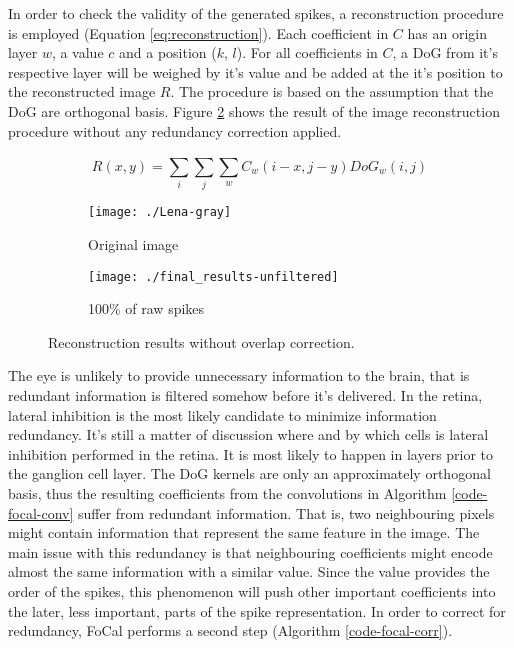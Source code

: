 In order to check the validity of the generated spikes, a reconstruction procedure is employed (Equation \ref{eq:reconstruction}). Each coefficient in $C$ has an origin layer $w$, a value $c$ and a position ($k$, $l$). For all coefficients in $C$, a DoG from it's respective layer will be weighed by it's value and be added at the it's position to the reconstructed image $R$. The procedure is based on the assumption that the DoG are orthogonal basis. Figure \ref{pic-unfiltered-spikes} shows the result of the image reconstruction procedure without any redundancy correction applied.

\begin{equation}
  R(x,y) = \sum_{i}^{} \sum_{j}^{} \sum_{w}^{} C_{w}(i - x, j - y)DoG_{w}(i, j)
  \label{eq:reconstruction}
\end{equation}

\begin{figure}[hbt]
  \centering
  \begin{subfigure}[t]{0.3\textwidth}
    \centering
    \captionsetup{justification=centering,margin=0.1cm}
    \texttt{[image: ./Lena-gray]}
    \caption{Original image}
  \end{subfigure}
  \begin{subfigure}[t]{0.3\textwidth}
    \centering
    \captionsetup{justification=centering,margin=0.1cm}
    \texttt{[image: ./final\_results-unfiltered]}
    \caption{100\% of raw spikes}
    \label{pic-unfiltered-spikes}
  \end{subfigure}
  \caption{Reconstruction results without overlap correction.}
\end{figure}

The eye is unlikely to provide unnecessary information to the brain, that is redundant information is filtered somehow before it's delivered. In the retina, lateral inhibition is the most likely candidate to minimize information redundancy. It's still a matter of discussion where and by which cells is lateral inhibition performed in the retina. It is most likely to happen in layers prior to the ganglion cell layer. The DoG kernels are only an approximately orthogonal basis, thus the resulting coefficients from the convolutions in Algorithm \ref{code-focal-conv} suffer from redundant information. That is, two neighbouring pixels might contain information that represent the same feature in the image. The main issue with this redundancy is that neighbouring coefficients might encode almost the same information with a similar value. Since the value provides the order of the spikes, this phenomenon will push other important coefficients into the later, less important, parts of the spike representation. In order to correct for redundancy, FoCal performs a second step (Algorithm \ref{code-focal-corr}).

